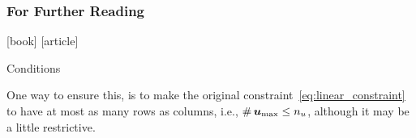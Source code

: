 \documentclass[aspectratio=169]{beamer}
\begin{document}
\begin{frame}[allowframebreaks]
% 
% 
  \frametitle<presentation>{For Further Reading}




[book]
\printbibliography[type=book,title={Books}]
[article]
\printbibliography[type={article},title={Articles}]
\printbibliography[type={inproceedings},title={Articles}]


\end{frame}

\begin{frame}{Conditions}{\hyperlink{analysis_deprived_systems}{}}
  \hypertarget{condition_transform_equality}{}

  One way to ensure this, is to make the original constraint~\eqref{eq:linear_constraint} to have at most as many rows as columns, i.e., $\operatorname{\#}{\boldsymbol{u}_{\max}}\leq n_{u}$, although it may be a little restrictive.
\end{frame}
\end{document}
